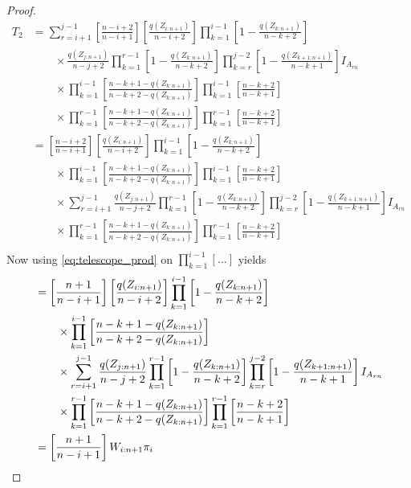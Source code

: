 \begin{proof}
\begin{align*}
	T_2 &= \sum\limits_{r=i+1}^{j-1} \left[\frac{n-i+2}{n-i+1}\right]\left[\frac{q(Z_{i:n+1})}{n-i+2}\right] \prod_{k=1}^{i-1}\left[1-\frac{q(Z_{k:n+1})}{n-k+2}\right] \\
	& \qquad \times \frac{q(Z_{j:n+1})}{n-j+2} \prod_{k=1}^{r-1}\left[1-\frac{q(Z_{k:n+1})}{n-k+2}\right]\prod_{k=r}^{j-2}\left[1-\frac{q(Z_{k+1:n+1})}{n-k+1}\right]I_{A_{rn}}\\
	& \qquad \times \prod_{k=1}^{i-1}\left[\frac{n-k+1-q(Z_{k:n+1})}{n-k+2-q(Z_{k:n+1})}\right] \prod_{k=1}^{i-1}\left[\frac{n-k+2}{n-k+1}\right]\\
	& \qquad \times \prod_{k=1}^{r-1}\left[\frac{n-k+1-q(Z_{k:n+1})}{n-k+2-q(Z_{k:n+1})}\right] \prod_{k=1}^{r-1}\left[\frac{n-k+2}{n-k+1}\right]\\
	&= \left[\frac{n-i+2}{n-i+1}\right]\left[\frac{q(Z_{i:n+1})}{n-i+2}\right] \prod_{k=1}^{i-1}\left[1-\frac{q(Z_{k:n+1})}{n-k+2}\right] \\
	& \qquad \times \prod_{k=1}^{i-1}\left[\frac{n-k+1-q(Z_{k:n+1})}{n-k+2-q(Z_{k:n+1})}\right] \prod_{k=1}^{i-1}\left[\frac{n-k+2}{n-k+1}\right]\\
	& \qquad \times \sum\limits_{r=i+1}^{j-1} \frac{q(Z_{j:n+1})}{n-j+2} \prod_{k=1}^{r-1}\left[1-\frac{q(Z_{k:n+1})}{n-k+2}\right]\prod_{k=r}^{j-2}\left[1-\frac{q(Z_{k+1:n+1})}{n-k+1}\right]I_{A_{rn}}\\
	& \qquad \times \prod_{k=1}^{r-1}\left[\frac{n-k+1-q(Z_{k:n+1})}{n-k+2-q(Z_{k:n+1})}\right] \prod_{k=1}^{r-1}\left[\frac{n-k+2}{n-k+1}\right]\\
\end{align*}
%
Now using \eqref{eq:telescope_prod} on $\prod_{k=1}^{i-1}[\ldots]$ yields
\begin{align*}
&= \left[\frac{n+1}{n-i+1}\right]\left[\frac{q(Z_{i:n+1})}{n-i+2}\right] \prod_{k=1}^{i-1}\left[1-\frac{q(Z_{k:n+1})}{n-k+2}\right] \\
& \qquad \times \prod_{k=1}^{i-1}\left[\frac{n-k+1-q(Z_{k:n+1})}{n-k+2-q(Z_{k:n+1})}\right]\\
& \qquad \times \sum\limits_{r=i+1}^{j-1} \frac{q(Z_{j:n+1})}{n-j+2} \prod_{k=1}^{r-1}\left[1-\frac{q(Z_{k:n+1})}{n-k+2}\right]\prod_{k=r}^{j-2}\left[1-\frac{q(Z_{k+1:n+1})}{n-k+1}\right]I_{A_{rn}}\\
& \qquad \times \prod_{k=1}^{r-1}\left[\frac{n-k+1-q(Z_{k:n+1})}{n-k+2-q(Z_{k:n+1})}\right] \prod_{k=1}^{r-1}\left[\frac{n-k+2}{n-k+1}\right]\\
&= \left[\frac{n+1}{n-i+1}\right]\wn{i}{n+1}\pi_i\\

\end{align*}
\end{proof}
